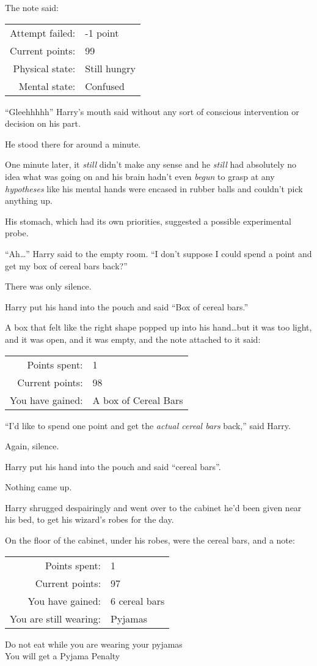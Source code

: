 The note said:
\begin{writtenNote}
\begin{tabular}{rl}
Attempt failed: & -1 point\\
Current points: & 99\\
Physical state: & Still hungry\\
Mental state: & Confused
\end{tabular}
\end{writtenNote}

“Gleehhhhh” Harry’s mouth said without any sort of conscious intervention or decision on his part.

He stood there for around a minute.

One minute later, it \emph{still} didn’t make any sense and he \emph{still} had absolutely no idea what was going on and his brain hadn’t even \emph{begun} to grasp at any \emph{hypotheses} like his mental hands were encased in rubber balls and couldn’t pick anything up.

His stomach, which had its own priorities, suggested a possible experimental probe.

“Ah…” Harry said to the empty room. “I don’t suppose I could spend a point and get my box of cereal bars back?”

There was only silence.

Harry put his hand into the pouch and said “Box of cereal bars.”

A box that felt like the right shape popped up into his hand…but it was too light, and it was open, and it was empty, and the note attached to it said:
\begin{writtenNote}
\begin{tabular}{rl}
Points spent: & 1\\
Current points: & 98\\
You have gained: & A box of Cereal Bars
\end{tabular}
\end{writtenNote}

“I’d like to spend one point and get the \emph{actual cereal bars} back,” said Harry.

Again, silence.

Harry put his hand into the pouch and said “cereal bars”.

Nothing came up.

Harry shrugged despairingly and went over to the cabinet he’d been given near his bed, to get his wizard’s robes for the day.

On the floor of the cabinet, under his robes, were the cereal bars, and a note:
\begin{writtenNote}
\begin{tabular}{rl}
Points spent: & 1\\
Current points: & 97\\
You have gained: & 6 cereal bars\\
You are still wearing: & Pyjamas\\
\end{tabular}

Do not eat while you are wearing your pyjamas\\
You will get a Pyjama Penalty
\end{writtenNote}

